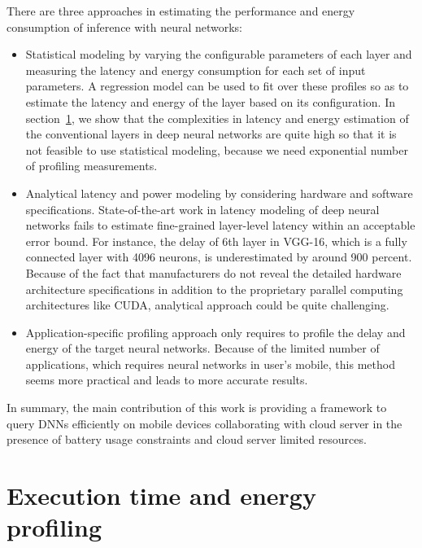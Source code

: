 \documentclass[conference,9pt]{IEEEtran}
\begin{document}
There are three approaches in estimating the performance and energy consumption of inference with neural networks: 
\begin{itemize}
\item
Statistical modeling by varying the configurable parameters of each layer and measuring the latency and energy consumption for each set of input parameters. A regression model can be used to fit over these profiles so as to estimate the latency and energy of the layer based on its configuration\cite{b29}. In section~\ref{profiling}, we show that the complexities in latency and energy estimation of the conventional layers in deep neural networks are quite high so that it is not feasible to use statistical modeling, because we need exponential number of profiling measurements.
\item
Analytical latency and power modeling by considering hardware and software specifications. State-of-the-art work in latency modeling of deep neural networks \cite{b7} fails to estimate fine-grained layer-level latency within an acceptable error bound. For instance, the delay of 6th layer in VGG-16, which is a fully connected layer with 4096 neurons, is underestimated by around 900 percent. Because of the fact that manufacturers do not reveal the detailed hardware architecture specifications in addition to the proprietary parallel computing architectures like CUDA, analytical approach could be quite challenging\cite{b8}.
\item
Application-specific profiling approach only requires to profile the delay and energy of the target neural networks. Because of the limited number of applications, which requires neural networks in user's mobile, this method seems more practical and leads to more accurate results.
\end{itemize}
In summary, the main contribution of this work is providing a framework to query DNNs efficiently on mobile devices collaborating with cloud server in the presence of battery usage constraints and cloud server limited resources.

\section{Execution time and energy profiling}\label{profiling}
\end{document}
